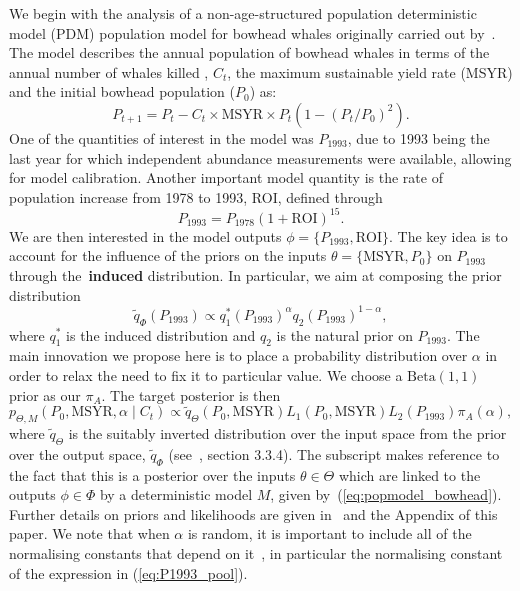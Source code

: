 \documentclass[a4paper, notitlepage, 11pt]{article}
\begin{document}
We begin with the analysis of a non-age-structured population deterministic model (PDM) population model for bowhead whales originally carried out by~\cite{Poole2000}.
The model describes the annual population of bowhead whales in terms of the annual number of whales killed , $C_t$, the maximum sustainable yield rate (MSYR) and the initial bowhead population ($P_0$) as:
\begin{equation}
\label{eq:popmodel_bowhead}
 P_{t + 1} = P_t - C_t \times \text{MSYR} \times P_t \left( 1- (P_t/P_0)^2 \right).
\end{equation}
One of the quantities of interest in the model was $P_{\text{1993}}$, due to 1993 being the last year for which independent abundance measurements were available, allowing for model calibration.
Another important model quantity is the rate of population increase from 1978 to 1993, ROI, defined through
\begin{equation*}
 \label{eq:ROI_P1993}
P_{1993} = P_{1978}(1 + \text{ROI})^{15}. 
\end{equation*}
We are then interested in the model outputs $\phi = \{P_{1993}, \text{ROI}\}$.
The key idea is to account for the influence of the priors on the inputs $\theta = \{\text{MSYR}, P_0\}$ on $P_{1993}$ through the~\textbf{induced} distribution.
In particular, we aim at composing the prior distribution
\begin{equation}
 \label{eq:P1993_pool}
 \tilde{q}_{\Phi}(P_{1993}) \propto q_1^\ast(P_{1993})^\alpha q_2(P_{1993})^{1-\alpha},
\end{equation}
where $q_1^\ast$ is the induced distribution and $q_2$ is the natural prior on $P_{1993}$.
The main innovation we propose here is to place a probability distribution over $\alpha$ in order to relax the need to fix it to particular value.
We choose a $\text{Beta}(1, 1)$ prior as our $\pi_A$.
The target posterior is then 
\begin{equation}
 \label{eq:bowhead_posterior}
  p_{\Theta, M}(P_0, \text{MSYR}, \alpha \mid C_t) \propto \tilde{q}_{\Theta}(P_0, \text{MSYR}) L_1(P_0, \text{MSYR}) L_2(P_{1993})\pi_A(\alpha),
\end{equation}
where $\tilde{q}_{\Theta}$ is the suitably inverted distribution over the input space from the prior over the output space, $\tilde{q}_{\Phi}$ (see~\cite{Poole2000}, section 3.3.4). 
The subscript makes reference to the fact that this is a posterior over the inputs $\theta \in \Theta$ which are linked to the outputs $\phi \in \Phi$ by a deterministic model $M$, given by~(\ref{eq:popmodel_bowhead}).
Further details on priors and likelihoods are given in~\cite{Poole2000} and the Appendix of this paper.
We note that when $\alpha$ is random, it is important to include all of the normalising constants that depend on it~\citep{Neuenschwander2009}, in particular the normalising constant of the expression in (\ref{eq:P1993_pool}).
\end{document}

